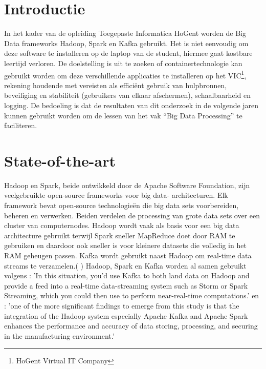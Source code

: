 
\section{Introductie}%
\label{sec:introductie}

In het kader van de opleiding Toegepaste Informatica HoGent worden de Big Data frameworks Hadoop, Spark en Kafka gebruikt. Het is niet eenvoudig om deze software te installeren op de laptop van de student, hiermee gaat kostbare leertijd verloren.
De doelstelling is uit te zoeken of containertechnologie kan gebruikt worden om deze verschillende applicaties te installeren op het VIC\footnote{HoGent Virtual IT Company}, rekening houdende met vereisten als efficiënt gebruik van hulpbronnen, beveiliging en stabiliteit (gebruikers van elkaar afschermen), schaalbaarheid en logging.
De bedoeling is dat de resultaten van dit onderzoek in de volgende jaren kunnen gebruikt worden om de lessen van het vak ``Big Data Processing'' te faciliteren.


\section{State-of-the-art}%
\label{sec:state-of-the-art}
Hadoop en Spark, beide ontwikkeld door de Apache Software Foundation, zijn veelgebruikte open-source frameworks voor big data- architecturen. Elk framework bevat open-source technologieën die big data sets voorbereiden, beheren en verwerken.
Beiden verdelen de processing van grote data sets over een cluster van computernodes.
Hadoop wordt vaak als basis voor een big data architecture gebruikt terwijl Spark sneller MapReduce doet door RAM te gebruiken en daardoor ook sneller is voor kleinere datasets die volledig in het RAM geheugen passen. Kafka wordt gebruikt naast Hadoop om real-time data streams te verzamelen.(\autocite{Hadoop} \autocite{Spark} \autocite{Kafka})
Hadoop, Spark en Kafka worden al samen gebruikt volgens \autocite{Holmes2012}:
'In this situation, you'd use Kafka to both land data on Hadoop and provide a feed into a real-time data-streaming system such as Storm or Spark Streaming, which you could then use to perform near-real-time computations.' en \autocite{Leang2019}:
'one of the more significant findings to emerge from this study is that the integration of the Hadoop system especially Apache Kafka and Apache Spark enhances the performance and accuracy of data storing, processing, and securing in the manufacturing environment.'

